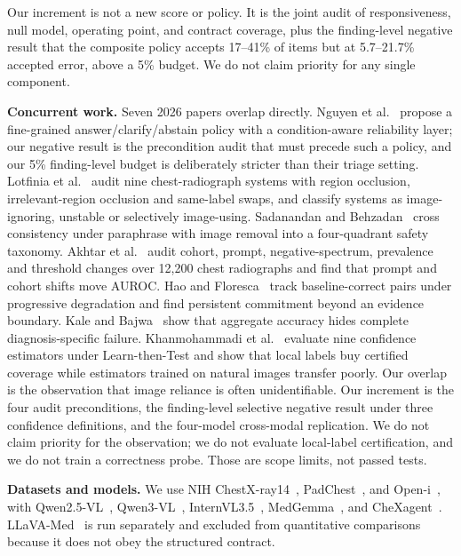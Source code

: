 Our increment is not a new score or policy. It is the joint audit of responsiveness, null model, operating point, and contract coverage, plus the finding-level negative result that the composite policy accepts 17--41\% of items but at 5.7--21.7\% accepted error, above a 5\% budget. We do not claim priority for any single component.

\textbf{Concurrent work.} Seven 2026 papers overlap directly. Nguyen et al.~\citep{nguyen2026answer} propose a fine-grained answer/clarify/abstain policy with a condition-aware reliability layer; our negative result is the precondition audit that must precede such a policy, and our 5\% finding-level budget is deliberately stricter than their triage setting. Lotfinia et al.~\citep{lotfinia2026needimage} audit nine chest-radiograph systems with region occlusion, irrelevant-region occlusion and same-label swaps, and classify systems as image-ignoring, unstable or selectively image-using. Sadanandan and Behzadan~\citep{sadanandan2026consistent} cross consistency under paraphrase with image removal into a four-quadrant safety taxonomy. Akhtar et al.~\citep{akhtar2026beyond} audit cohort, prompt, negative-spectrum, prevalence and threshold changes over 12,200 chest radiographs and find that prompt and cohort shifts move AUROC. Hao and Floresca~\citep{hao2026evidence} track baseline-correct pairs under progressive degradation and find persistent commitment beyond an evidence boundary. Kale and Bajwa~\citep{kale2026aggregate} show that aggregate accuracy hides complete diagnosis-specific failure. Khanmohammadi et al.~\citep{khanmohammadi2026calibrated} evaluate nine confidence estimators under Learn-then-Test and show that local labels buy certified coverage while estimators trained on natural images transfer poorly. Our overlap is the observation that image reliance is often unidentifiable. Our increment is the four audit preconditions, the finding-level selective negative result under three confidence definitions, and the four-model cross-modal replication. We do not claim priority for the observation; we do not evaluate local-label certification, and we do not train a correctness probe. Those are scope limits, not passed tests.

\textbf{Datasets and models.} We use NIH ChestX-ray14~\citep{wang2017chestxray8}, PadChest~\citep{bustos2020padchest}, and Open-i~\citep{demnerfushman2016openi}, with Qwen2.5-VL~\citep{bai2025qwen25vl}, Qwen3-VL~\citep{qwen2025qwen3vl}, InternVL3.5~\citep{opengvlab2025internvl35}, MedGemma~\citep{sellergren2025medgemma}, and CheXagent~\citep{chen2024chexagent}. LLaVA-Med~\citep{li2024llavamed} is run separately and excluded from quantitative comparisons because it does not obey the structured contract.
